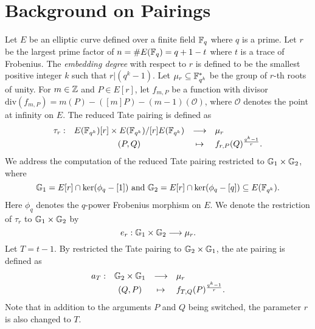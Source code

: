 \section{Background on Pairings}
\label{sec:background}

Let $E$ be an elliptic curve defined over a finite field $\mathbb{F}_{q}$ where $q$ is a prime.
Let $r$ be the largest prime factor of $n = \#E(\mathbb{F}_{q}) = q + 1 - t$ where $t$ is a trace of Frobenius.
The \emph{embedding degree} with respect to $r$ is defined to be the smallest positive integer $k$ such that $r | (q^k-1)$.
Let $\mu_{r} \subseteq \mathbb{F}_{q^{k}}^{*}$ be the group of $r$-th roots of unity.
For $m \in \mathbb{Z}$ and $P \in E[r]$,
let $f_{m,P}$ be a function with divisor 
$\text{div}(f_{m,P}) = m(P) - ([m]P) - (m-1)(\mathcal{O})$,
where $\mathcal{O}$ denotes the point at infinity on $E$.
The reduced Tate pairing is defined as
\[\begin{array}{rccl}
\tau_{r} :	& E(\mathbb{F}_{q^{k}})[r] \times E(\mathbb{F}_{q^{k}})/[r]E(\mathbb{F}_{q^{k}})	& \longrightarrow	& \mu_{r} \\
		& (P,Q)								& \mapsto		& f_{r,P}(Q)^{\frac{q^{k}-1}{r}}.
\end{array}\]
We address the computation of the reduced Tate pairing restricted to $\mathbb{G}_{1} \times \mathbb{G}_{2}$, where
$$\mathbb{G}_{1} = E[r] \cap \ker(\phi_{q}-[1]) \text{ and }
\mathbb{G}_{2} = E[r] \cap \ker(\phi_{q} - [q]) \subseteq E(\mathbb{F}_{q^{k}}).$$
Here $\phi_{q}$ denotes the $q$-power Frobenius morphism on $E$.
We denote the restriction of $\tau_{r}$ to $\mathbb{G}_{1} \times \mathbb{G}_{2}$ by
$$e_{r} : \mathbb{G}_{1} \times \mathbb{G}_{2} \longrightarrow \mu_{r}.$$
Let $T = t-1$.
By restricted the Tate pairing to $\mathbb{G}_{2} \times \mathbb{G}_{1}$, the ate pairing is defined as
\[\begin{array}{rccl}
a_{T} :	& \mathbb{G}_{2} \times \mathbb{G}_{1}	& \longrightarrow	& \mu_{r} \\
	& (Q,P) 		& \mapsto		& f_{T,Q}(P)^{\frac{q^{k}-1}{r}}.
\end{array}\]
Note that in addition to the arguments $P$ and $Q$ being switched, the parameter $r$ is also changed to $T$.

%

